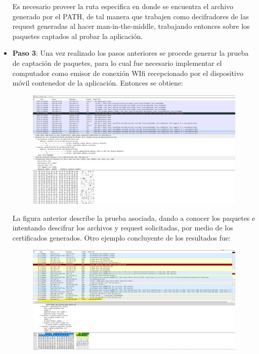 \documentclass[a4paper,11pt]{article}
\theoremstyle{mytheor}
\begin{document}
\begin{itemize}
 
Es necesario proveer la ruta especifica en donde se encuentra el archivo generado por el PATH, de tal manera que trabajen como decifradores de las request generadas al hacer man-in-the-middle, trabajando entonces sobre los paquetes captados al probar la aplicación.
    
    \item \textbf{Paso 3}: Una vez realizado los pasos anteriores se procede generar la prueba de captación de paquetes, para lo cual fue necesario implementar el computador como emisor de conexión WIfi recepcionado por el dispositivo móvil contenedor de la aplicación. Entonces se obtiene:
    
    \newpage
  
    
    \begin{figure}[!h]
    \centering
    \includegraphics[scale=0.27]{paqueteswiressl.png}
    \label{fig:my_label}
    \end{figure}
    
    La figura anterior describe la prueba asociada, dando a conocer los paquetes e intentando descifrar los archivos y request solicitadas, por medio de los certificados generados. Otro ejemplo concluyente de los resultados fue:
    
    \begin{figure}[!h]
    \centering
    \includegraphics[scale=0.25]{paquetelectura.png}
    \label{fig:my_label}
    \end{figure}
    

\end{itemize}
\end{document}
